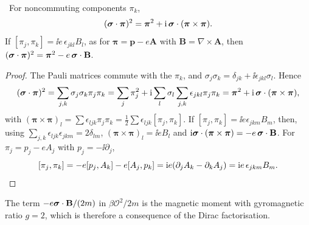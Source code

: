 \begin{theorem}\label{thm:pauli}\ver\
For noncommuting components $\pi_k$,
\[
(\boldsymbol{\sigma}\cdot\bm\pi)^2=\bm\pi^2+\mathrm{i}\,\boldsymbol{\sigma}\cdot(\bm\pi\times\bm\pi).
\]
If $[\pi_j,\pi_k]=\ii e\,\epsilon_{jkl}B_l$, as for $\bm\pi=\mathbf p-e\mathbf A$ with $\mathbf B=\nabla\times\mathbf A$, then $(\boldsymbol{\sigma}\cdot\bm\pi)^2=\bm\pi^2-e\,\boldsymbol{\sigma}\cdot\mathbf B$.
\end{theorem}
\begin{proof}
The Pauli matrices commute with the $\pi_k$, and $\sigma_j\sigma_k=\delta_{jk}+\ii\epsilon_{jkl}\sigma_l$. Hence
\[
(\boldsymbol{\sigma}\cdot\bm\pi)^2=\sum_{j,k}\sigma_j\sigma_k\pi_j\pi_k=\sum_j\pi_j^2+\mathrm{i}\sum_l\sigma_l\sum_{j,k}\epsilon_{jkl}\pi_j\pi_k=\bm\pi^2+\mathrm{i}\,\boldsymbol{\sigma}\cdot(\bm\pi\times\bm\pi),
\]
with $(\bm\pi\times\bm\pi)_l=\sum\epsilon_{ljk}\pi_j\pi_k=\frac12\sum\epsilon_{ljk}[\pi_j,\pi_k]$. If $[\pi_j,\pi_k]=\ii e\epsilon_{jkm}B_m$, then, using $\sum_{j,k}\epsilon_{ljk}\epsilon_{jkm}=2\delta_{lm}$, $(\bm\pi\times\bm\pi)_l=\ii eB_l$ and $\mathrm{i}\boldsymbol{\sigma}\cdot(\bm\pi\times\bm\pi)=-e\,\boldsymbol{\sigma}\cdot\mathbf B$. For $\pi_j=p_j-eA_j$ with $p_j=-\ii\partial_j$,
\[
[\pi_j,\pi_k]=-e[p_j,A_k]-e[A_j,p_k]=\mathrm{i} e(\partial_jA_k-\partial_kA_j)=\mathrm{i} e\,\epsilon_{jkm}B_m .\qedhere
\]
\end{proof}


The term $-e\boldsymbol{\sigma}\cdot\mathbf B/(2m)$ in $\beta\mathcal O^2/2m$ is the magnetic moment with gyromagnetic ratio $g=2$, which is therefore a consequence of the Dirac factorisation.

